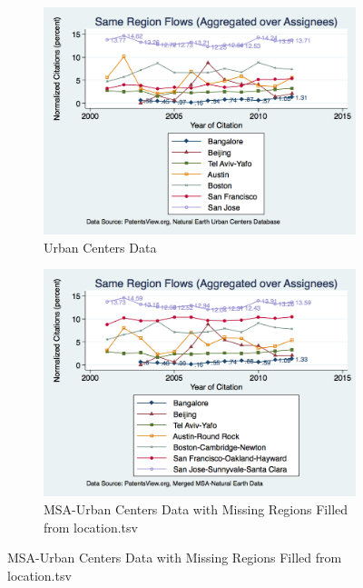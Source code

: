 \documentclass[12pt]{article}
\begin{document}
\begin{figure}
  \begin{subfigure}[b]{\textwidth}
    \includegraphics[width=\textwidth]{UCSameRegionFlows}
    \caption{Urban Centers Data}
    \label{fig:UCSameRegionFlows}
  \end{subfigure}
  
  \begin{subfigure}[b]{\textwidth}
    \includegraphics[width=\textwidth]{SameRegionFlows}
    \caption{MSA-Urban Centers Data with Missing Regions Filled from location.tsv}
    \label{fig:SameRegionFlows}
  \end{subfigure}
\end{figure}
\end{document}
